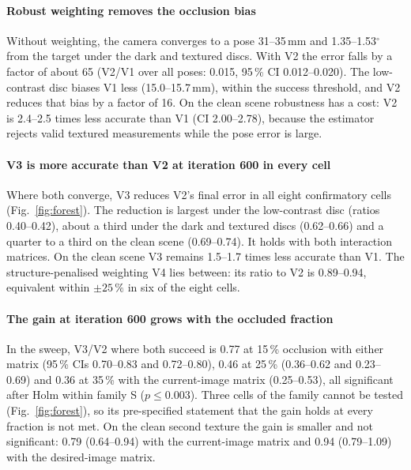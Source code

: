 \documentclass[preprint,12pt]{elsarticle}
\theoremstyle{remark}
\begin{document}
\paragraph{Robust weighting removes the occlusion bias}
Without weighting, the camera converges to a pose 31--35\,mm and
1.35--1.53$^{\circ}$ from the target under the dark and textured discs. With
V2 the error falls by a factor of about 65 (V2/V1 over all poses:
0.015, 95\,\% CI 0.012--0.020). The low-contrast disc biases V1 less
(15.0--15.7\,mm), within the success threshold, and V2 reduces that bias by a
factor of 16. On the clean scene robustness has a cost: V2 is 2.4--2.5 times
less accurate than V1 (CI 2.00--2.78), because the estimator rejects valid
textured measurements while the pose error is large.

\paragraph{V3 is more accurate than V2 at iteration 600 in every cell}
Where both converge, V3 reduces V2's final error in all eight confirmatory
cells (Fig.~\ref{fig:forest}). The reduction is largest under the low-contrast
disc (ratios 0.40--0.42), about a third under the dark and textured discs
(0.62--0.66) and a quarter to a third on the clean scene (0.69--0.74). It holds
with both interaction matrices. On the clean scene V3 remains 1.5--1.7 times
less accurate than V1. The structure-penalised weighting V4 lies between: its
ratio to V2 is 0.89--0.94, equivalent within $\pm25\,\%$ in six of the eight
cells.

\paragraph{The gain at iteration 600 grows with the occluded fraction}
In the sweep, V3/V2 where both succeed is 0.77 at 15\,\% occlusion with either
matrix (95\,\% CIs 0.70--0.83 and 0.72--0.80), 0.46 at 25\,\% (0.36--0.62 and
0.23--0.69) and 0.36 at 35\,\% with the current-image matrix (0.25--0.53), all
significant after Holm within family S ($p\le0.003$). Three cells of the family
cannot be tested (Fig.~\ref{fig:forest}), so its pre-specified statement that
the gain holds at every fraction is not met. On the clean second texture the
gain is smaller and not significant: 0.79 (0.64--0.94) with the current-image
matrix and 0.94 (0.79--1.09) with the desired-image matrix.
\end{document}
